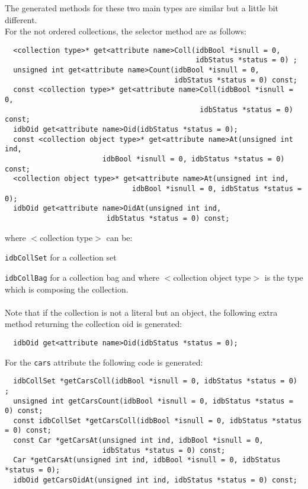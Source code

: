 The generated methods for these two main types are similar but a
little bit different.
\\
For the not ordered collections, the selector method are as follows:
\verbsize
\begin{verbatim}
  <collection type>* get<attribute name>Coll(idbBool *isnull = 0,
                                             idbStatus *status = 0) ;
  unsigned int get<attribute name>Count(idbBool *isnull = 0,
                                        idbStatus *status = 0) const;
  const <collection type>* get<attribute name>Coll(idbBool *isnull = 0,
                                              idbStatus *status = 0) const;
  idbOid get<attribute name>Oid(idbStatus *status = 0);
  const <collection object type>* get<attribute name>At(unsigned int ind,
                       idbBool *isnull = 0, idbStatus *status = 0) const;
  <collection object type>* get<attribute name>At(unsigned int ind,
                              idbBool *isnull = 0, idbStatus *status = 0);
  idbOid get<attribute name>OidAt(unsigned int ind,
                        idbStatus *status = 0) const;
\end{verbatim}
\normalsize
where $<$collection type$>$ can be:
\be
\item \texttt{idbCollSet} for a collection set
\item \texttt{idbCollBag} for a collection bag
\ee
and where $<$collection object type$>$ is the type which is composing
the collection.
\\
\\
Note that if the collection is not a literal but an object, the following
extra method returning the collection oid is generated:
\verbsize
\begin{verbatim}
  idbOid get<attribute name>Oid(idbStatus *status = 0);
\end{verbatim}
\normalsize
For the \texttt{cars} attribute the following code is generated:
\verbsize
\begin{verbatim}
  idbCollSet *getCarsColl(idbBool *isnull = 0, idbStatus *status = 0) ;
  unsigned int getCarsCount(idbBool *isnull = 0, idbStatus *status = 0) const;
  const idbCollSet *getCarsColl(idbBool *isnull = 0, idbStatus *status = 0) const;
  const Car *getCarsAt(unsigned int ind, idbBool *isnull = 0,
                       idbStatus *status = 0) const;
  Car *getCarsAt(unsigned int ind, idbBool *isnull = 0, idbStatus *status = 0);
  idbOid getCarsOidAt(unsigned int ind, idbStatus *status = 0) const;
\end{verbatim}
